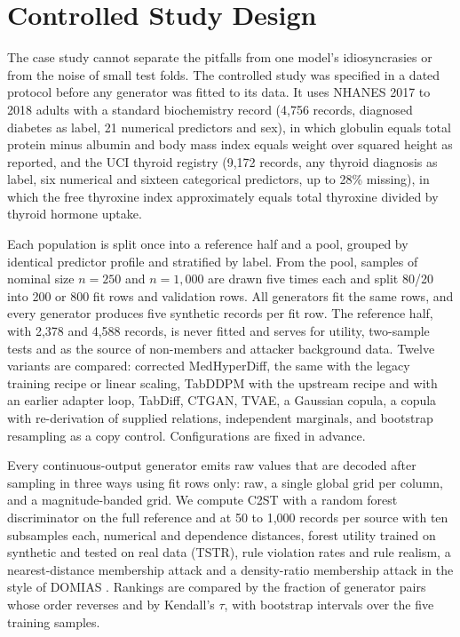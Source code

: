 \documentclass[conference]{IEEEtran}
\begin{document}
\section{Controlled Study Design}

The case study cannot separate the pitfalls from one model's idiosyncrasies or from the noise of small test folds. The controlled study was specified in a dated protocol before any generator was fitted to its data. It uses NHANES 2017 to 2018 \cite{nhanes} adults with a standard biochemistry record (4,756 records, diagnosed diabetes as label, 21 numerical predictors and sex), in which globulin equals total protein minus albumin and body mass index equals weight over squared height as reported, and the UCI thyroid registry (9,172 records, any thyroid diagnosis as label, six numerical and sixteen categorical predictors, up to 28\% missing), in which the free thyroxine index approximately equals total thyroxine divided by thyroid hormone uptake.

Each population is split once into a reference half and a pool, grouped by identical predictor profile and stratified by label. From the pool, samples of nominal size $n = 250$ and $n = 1{,}000$ are drawn five times each and split 80/20 into 200 or 800 fit rows and validation rows. All generators fit the same rows, and every generator produces five synthetic records per fit row. The reference half, with 2,378 and 4,588 records, is never fitted and serves for utility, two-sample tests and as the source of non-members and attacker background data. Twelve variants are compared: corrected MedHyperDiff, the same with the legacy training recipe or linear scaling, TabDDPM with the upstream recipe and with an earlier adapter loop, TabDiff, CTGAN, TVAE, a Gaussian copula, a copula with re-derivation of supplied relations, independent marginals, and bootstrap resampling as a copy control. Configurations are fixed in advance.

Every continuous-output generator emits raw values that are decoded after sampling in three ways using fit rows only: raw, a single global grid per column, and a magnitude-banded grid. We compute C2ST with a random forest discriminator on the full reference and at 50 to 1,000 records per source with ten subsamples each, numerical and dependence distances, forest utility trained on synthetic and tested on real data (TSTR), rule violation rates and rule realism, a nearest-distance membership attack and a density-ratio membership attack in the style of DOMIAS \cite{vanbreugel2023domias}. Rankings are compared by the fraction of generator pairs whose order reverses and by Kendall's $\tau$, with bootstrap intervals over the five training samples.
\end{document}
